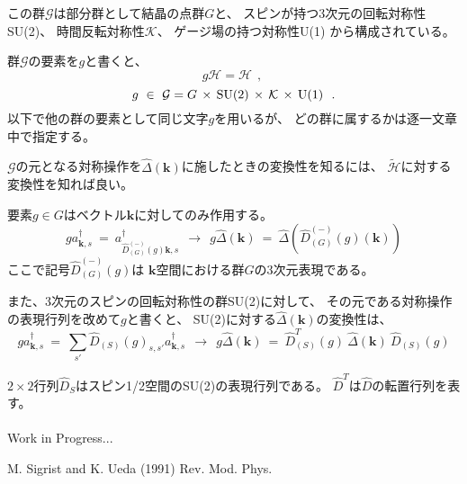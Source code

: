 \documentclass[uplatex,a4j,12pt,dvipdfmx]{jsarticle}
\begin{document}
この群$\mathcal{G}$は部分群として結晶の点群$G$と、
スピンが持つ3次元の回転対称性SU(2)、
時間反転対称性$\mathcal{K}$、
ゲージ場の持つ対称性U(1)
から構成されている。

群$\mathcal{G}$の要素を$g$と書くと、
\[
	g
	\mathcal{H}
	=
	\mathcal{H}
	\ \ ,
	\ \]\[
	g
	\ \in \
	\mathcal{G}
	=
	G \ \! \times \ \! {\rm SU(2)} \ \! \times \ \! \mathcal{K} \ \! \times \ \! {\rm U(1)}
	\ \ .
\]
以下で他の群の要素として同じ文字$g$を用いるが、
どの群に属するかは逐一文章中で指定する。

$\mathcal{G}$の元となる対称操作を$\hat{\Delta}(\bm{k})$に施したときの変換性を知るには、
$\tilde{\mathcal{H}}$に対する変換性を知れば良い。

要素$g \in G$はベクトル$\bm{k}$に対してのみ作用する。
\[
	g a_{\bm{k},s}^{\dagger}
	\ = \
	a_{ \hat{D}_{(G)}^{(-)}(g) \bm{k},s}^{\dagger}
	\ \ \longrightarrow \ \
	g \hat{\Delta}(\bm{k})
	\ = \
	\hat{\Delta}(\hat{D}_{(G)}^{(-)}(g) (\bm{k}))
\]
ここで記号$\hat{D}_{(G)}^{(-)}(g)$は
$\bm{k}$空間における群$G$の3次元表現である。

また、3次元のスピンの回転対称性の群SU(2)に対して、
その元である対称操作の表現行列を改めて$g$と書くと、
SU(2)に対する$\hat{\Delta}(\bm{k})$の変換性は、
\[
	g a_{\bm{k},s}^{\dagger}
	\ = \
	\sum_{s'}
	\hat{D}_{(S)} (g)_{s,s'}
	a_{\bm{k},s}^{\dagger}
	\ \ \longrightarrow \ \
	g \hat{\Delta}(\bm{k})
	\ = \
	\hat{D}_{(S)}^{T} (g) \ \!
	\hat{\Delta}(\bm{k}) \ \!
	\hat{D}_{(S)} (g)
\]

$2 \times 2$行列$\hat{D}_{S}$はスピン1/2空間のSU(2)の表現行列である。
$\hat{D}^{T}$は$\hat{D}$の転置行列を表す。
\ \\

\ \\

Work in Progress...

\begin{thebibliography}{9}
	 M. Sigrist and K. Ueda (1991) Rev. Mod. Phys.

\end{thebibliography}
\end{document}
